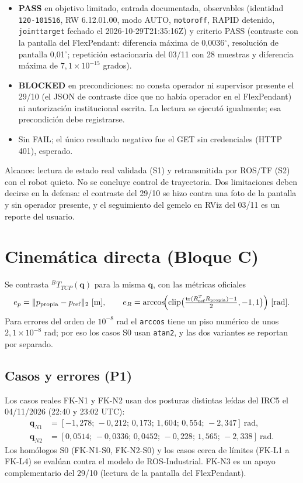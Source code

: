\documentclass[10pt,a4paper]{article}
\newcommand{\ep}{e_p}
\newcommand{\eR}{e_R}
\begin{document}
\begin{itemize}[leftmargin=*]
\item \textbf{PASS} en objetivo limitado, entrada documentada, observables (identidad \texttt{120-101516}, RW 6.12.01.00, modo AUTO, \texttt{motoroff}, RAPID detenido, \texttt{jointtarget} fechado el 2026-10-29T21:35:16Z) y criterio PASS (contraste con la pantalla del FlexPendant: diferencia máxima de 0,0036$^\circ$, resolución de pantalla 0,01$^\circ$; repetición estacionaria del 03/11 con 28 muestras y diferencia máxima de $7{,}1\times10^{-15}$ grados).
\item \textbf{BLOCKED} en precondiciones: no consta operador ni supervisor presente el 29/10 (el JSON de contraste dice que no había operador en el FlexPendant) ni autorización institucional escrita. La lectura se ejecutó igualmente; esa precondición debe registrarse.
\item Sin FAIL; el único resultado negativo fue el GET sin credenciales (HTTP 401), esperado.
\end{itemize}
Alcance: lectura de estado real validada (S1) y retransmitida por ROS/TF (S2) con el robot quieto. No se concluye control de trayectoria. Dos limitaciones deben decirse en la defensa: el contraste del 29/10 se hizo contra una foto de la pantalla y sin operador presente, y el seguimiento del gemelo en RViz del 03/11 es un reporte del usuario.

\section{Cinemática directa (Bloque C)}
\label{sec:fk}

Se contrasta ${}^BT_{TCP}(\mathbf{q})$ para la misma $\mathbf{q}$, con las métricas oficiales
\begin{equation}
\ep=\lVert p_{\mathrm{propia}}-p_{\mathrm{ref}}\rVert_2\ [\mathrm{m}],\qquad
\eR=\arccos\!\Bigl(\operatorname{clip}\bigl(\tfrac{\operatorname{tr}(R_{\mathrm{ref}}^{T}R_{\mathrm{propia}})-1}{2},-1,1\bigr)\Bigr)\ [\mathrm{rad}].
\end{equation}
Para errores del orden de $10^{-8}$ rad el \texttt{arccos} tiene un piso numérico de unos $2{,}1\times10^{-8}$ rad; por eso los casos S0 usan \texttt{atan2}, y las dos variantes se reportan por separado.

\subsection{Casos y errores (P1)}
Los casos reales FK-N1 y FK-N2 usan dos posturas distintas leídas del IRC5 el 04/11/2026 (22:40 y 23:02 UTC):
\begin{align*}
\mathbf{q}_{N1}&=[-1{,}278;\,-0{,}212;\,0{,}173;\,1{,}604;\,0{,}554;\,-2{,}347]\ \mathrm{rad},\\
\mathbf{q}_{N2}&=[0{,}0514;\,-0{,}0336;\,0{,}0452;\,-0{,}228;\,1{,}565;\,-2{,}338]\ \mathrm{rad}.
\end{align*}
Los homólogos S0 (FK-N1-S0, FK-N2-S0) y los casos cerca de límites (FK-L1 a FK-L4) se evalúan contra el modelo de ROS-Industrial. FK-N3 es un apoyo complementario del 29/10 (lectura de la pantalla del FlexPendant).
\end{document}

